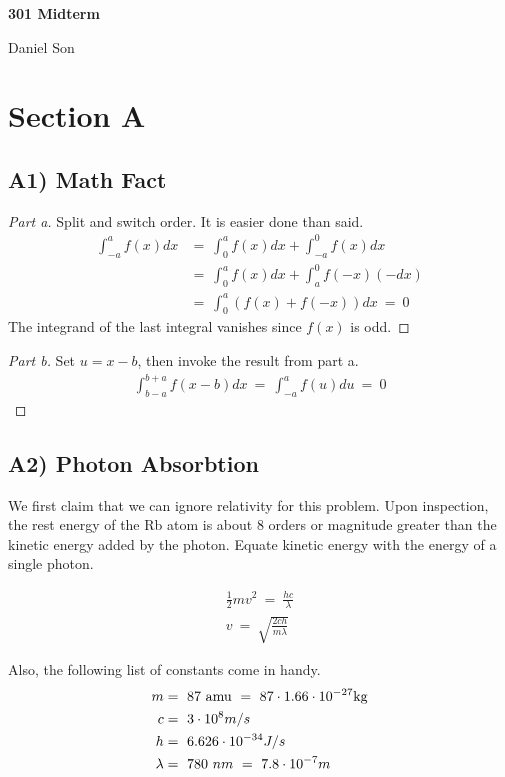 \documentclass{article}
\numberwithin{equation}{section}
\begin{document}
\begin{center}
    \Large
    \textbf{301 Midterm}

    \large
    Daniel Son
\end{center}

\section{Section A}
\subsection*{A1) Math Fact}

\begin{proof}
    [Part a] 
    Split and switch order. It is easier done than said. 
    \begin{align}
        \int_{-a} ^a f(x) dx & = \ \int_0^a f(x) dx + \int_{-a}^0 
        f(x) dx \ \\ & = \  
        \int_0^a f(x) dx + \int_a^0 f(-x) (-dx) 
        \\ & = \
        \int_0^a \left(f(x) + f(-x)\right)dx 
        \ = \ 
        0
    \end{align}
    The integrand of the last integral vanishes since $f(x)$ is odd. 
\end{proof}

\begin{proof}
    [Part b] 
    Set $u = x - b$, then invoke the result from part a. 
    \begin{align}
        \int_{b - a}^{b + a} f(x - b) dx  \ = \ 
        \int_{-a}^{a} f(u) du \ = \ 0
    \end{align}
\end{proof}

\subsection*{A2) Photon Absorbtion} 
We first claim that we can ignore relativity for this problem. 
Upon inspection, the rest energy of the Rb atom is about 8 orders 
or magnitude greater than the kinetic energy added by the photon. 
Equate kinetic energy with the energy of a single photon. 

\begin{align}
    \frac 1 2 m v^2 \ = \ \frac {hc} {\lambda} \\ 
    v \ = \ \sqrt{\frac {2 c h}{m \lambda}}
\end{align}

Also, the following list of constants come in handy. 
\begin{align*}
    m & = \ 87 \ \rm amu \ = \ 87 \cdot 1.66 \cdot 10^{-27} kg \\
    c & = \ 3 \cdot 10^8 m/s \\ 
    h & = \ 6.626 \cdot 10^{-34} J/s \\ 
    \lambda & = \ 780 \ nm \ = \ 7.8 \cdot 10^{-7} m
\end{align*}
\end{document}
